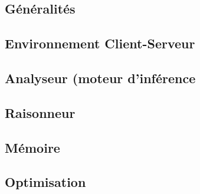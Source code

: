 \subsection{Généralités}


\subsection{Environnement Client-Serveur}


\subsection{Analyseur (moteur d'inférence}


\subsection{Raisonneur}


\subsection{Mémoire}


\subsection{Optimisation}
